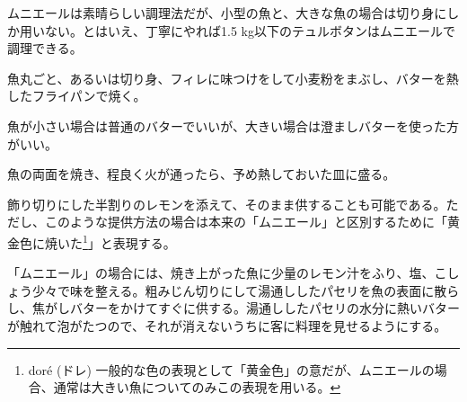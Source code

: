 ムニエールは素晴らしい調理法だが、小型の魚と、大きな魚の場合は切り身にしか用いない。とはいえ、丁寧にやれば1.5
kg以下のテュルボタンはムニエールで調理できる。

魚丸ごと、あるいは切り身、フィレに味つけをして小麦粉をまぶし、バターを熱したフライパンで焼く。

魚が小さい場合は普通のバターでいいが、大きい場合は澄ましバターを使った方がいい。

魚の両面を焼き、程良く火が通ったら、予め熱しておいた皿に盛る。

飾り切りにした半割りのレモンを添えて、そのまま供することも可能である。ただし、このような提供方法の場合は本来の「ムニエール」と区別するために「黄金色に焼いた\footnote{doré
  (ドレ)
  一般的な色の表現として「黄金色」の意だが、ムニエールの場合、通常は大きい魚についてのみこの表現を用いる。}」と表現する。

「ムニエール」の場合には、焼き上がった魚に少量のレモン汁をふり、塩、こしょう少々で味を整える。粗みじん切りにして湯通ししたパセリを魚の表面に散らし、焦がしバターをかけてすぐに供する。湯通ししたパセリの水分に熱いバターが触れて泡がたつので、それが消えないうちに客に料理を見せるようにする。
